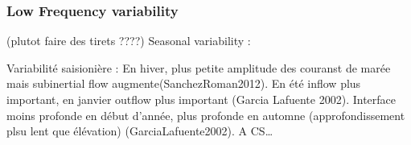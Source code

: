 








\subsubsection{Low Frequency variability}
(plutot faire des tirets ????)
Seasonal variability : 

Variabilité saisionière : En hiver, plus petite amplitude des couranst de marée mais subinertial flow augmente(SanchezRoman2012). En été inflow plus important, en janvier outflow plus important (Garcia Lafuente 2002). Interface moins profonde en début d’année, plus profonde en automne (approfondissement plsu lent que élévation) (GarciaLafuente2002).
A CS…




